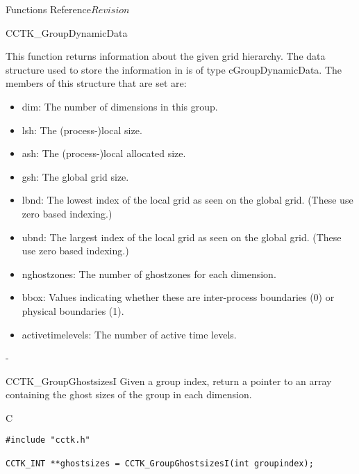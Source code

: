 \begin{cactuspart}{ Functions Reference}{}{$Revision$}
\begin{FunctionDescription}{CCTK\_GroupDynamicData}{}
\begin{Discussion}
This function returns information about the given grid hierarchy.
The data structure used to store the information in is of type cGroupDynamicData.
The members of this structure that are set are:
\begin{itemize}
\item{dim:} The number of dimensions in this group.
\item{lsh:} The (process-)local size.
\item{ash:} The (process-)local allocated size.
\item{gsh:} The global grid size.
\item{lbnd:} The lowest index of the local grid as seen on the global
  grid. (These use zero based indexing.)
\item{ubnd:} The largest index of the local grid as seen on the global
  grid. (These use zero based indexing.)
\item{nghostzones:} The number of ghostzones for each dimension.
\item{bbox:} Values indicating whether these are inter-process
  boundaries (0) or physical boundaries (1).
\item{activetimelevels:} The number of active time levels.
\end{itemize}-
\end{Discussion}

\end{FunctionDescription}

\begin{FunctionDescription}{CCTK\_GroupGhostsizesI}
\label{CCTK-GroupGhostsizesI}
Given a group index, return a pointer to an array containing the ghost sizes of the group in each dimension.
 
\begin{SynopsisSection}
\begin{Synopsis}{C}
\begin{verbatim}
#include "cctk.h"

CCTK_INT **ghostsizes = CCTK_GroupGhostsizesI(int groupindex);
\end{verbatim}
\end{Synopsis}
\end{SynopsisSection}


\end{FunctionDescription}
\end{cactuspart}
